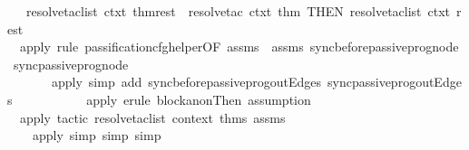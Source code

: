\begin{isabellebody}
\ {\isacharbar}{\kern0pt}\ \ resolve{\isacharunderscore}{\kern0pt}tac{\isacharunderscore}{\kern0pt}list\ ctxt\ {\isacharparenleft}{\kern0pt}thm{\isacharcolon}{\kern0pt}{\isacharcolon}{\kern0pt}rest{\isacharparenright}{\kern0pt}\ {\isacharequal}{\kern0pt}\ resolve{\isacharunderscore}{\kern0pt}tac\ ctxt\ {\isacharbrackleft}{\kern0pt}thm{\isacharbrackright}{\kern0pt}\ THEN{\isacharprime}{\kern0pt}\ resolve{\isacharunderscore}{\kern0pt}tac{\isacharunderscore}{\kern0pt}list\ ctxt\ rest\isanewline
\isanewline
{\isacharparenleft}{\kern0pt}{\isacharasterisk}{\kern0pt}\ \isanewline
\ \ apply\ {\isacharparenleft}{\kern0pt}rule\ passification{\isacharunderscore}{\kern0pt}cfg{\isacharunderscore}{\kern0pt}helper{\isacharbrackleft}{\kern0pt}OF\ assms{\isacharparenleft}{\kern0pt}{}{\isacharparenright}{\kern0pt}\ {\isacharunderscore}{\kern0pt}\ assms{\isacharparenleft}{\kern0pt}{}{\isacharparenright}{\kern0pt}\ sync{\isacharunderscore}{\kern0pt}before{\isacharunderscore}{\kern0pt}passive{\isacharunderscore}{\kern0pt}prog{\isachardot}{\kern0pt}node{\isacharunderscore}{\kern0pt}{}\ sync{\isacharunderscore}{\kern0pt}passive{\isacharunderscore}{\kern0pt}prog{\isachardot}{\kern0pt}node{\isacharunderscore}{\kern0pt}{}\ {\isacharbrackright}{\kern0pt}{\isacharparenright}{\kern0pt}\ \ \ \ \ \ \ \ \ \ \ \isanewline
\ \ \ \ \ \ \ apply\ {\isacharparenleft}{\kern0pt}simp\ add{\isacharcolon}{\kern0pt}\ sync{\isacharunderscore}{\kern0pt}before{\isacharunderscore}{\kern0pt}passive{\isacharunderscore}{\kern0pt}prog{\isachardot}{\kern0pt}outEdges{\isacharunderscore}{\kern0pt}{}\ sync{\isacharunderscore}{\kern0pt}passive{\isacharunderscore}{\kern0pt}prog{\isachardot}{\kern0pt}outEdges{\isacharunderscore}{\kern0pt}{}{\isacharparenright}{\kern0pt}\ \ \ \ \ \isanewline
\ \ \ \ \ \ apply\ {\isacharparenleft}{\kern0pt}erule\ block{\isacharunderscore}{\kern0pt}anon{}{\isacharunderscore}{\kern0pt}Then{\isacharcomma}{\kern0pt}\ assumption{\isacharparenright}{\kern0pt}\isanewline
\ \ apply\ {\isacharparenleft}{\kern0pt}tactic\ {\isasymopen}resolve{\isacharunderscore}{\kern0pt}tac{\isacharunderscore}{\kern0pt}list\ {\isacharat}{\kern0pt}{\isacharbraceleft}{\kern0pt}context{\isacharbraceright}{\kern0pt}\ {\isacharat}{\kern0pt}{\isacharbraceleft}{\kern0pt}thms\ assms{\isacharparenleft}{\kern0pt}{}{\isacharminus}{\kern0pt}{\isacharparenright}{\kern0pt}{\isacharbraceright}{\kern0pt}\ {}{\isasymclose}{\isacharparenright}{\kern0pt}\ \ \ \ \ \isanewline
\ \ \ \ apply\ {\isacharparenleft}{\kern0pt}simp{\isacharcomma}{\kern0pt}\ simp{\isacharcomma}{\kern0pt}\ simp{\isacharparenright}{\kern0pt}\ \ \isanewline

\end{isabellebody}

